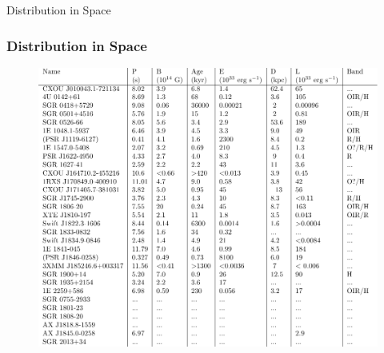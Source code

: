 \documentclass[hyperref=pdftex, presentation]{beamer}
\begin{document}
\begin{frame}{\Large Distribution in Space}
\frametitle{\Large Distribution in Space}

\begin{figure}
	\includegraphics[scale=.5]{magnetar_table.pdf}
\end{figure}

\end{frame}

\end{document}

